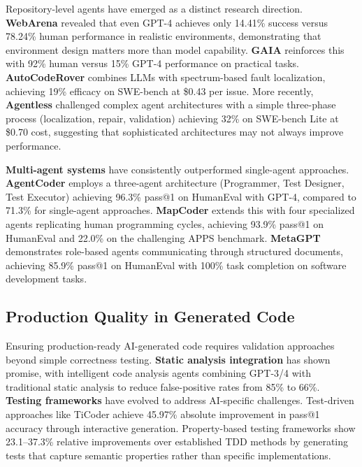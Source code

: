 \documentclass[11pt]{article}
\begin{document}
Repository-level agents have emerged as a distinct research direction. \textbf{WebArena} \citep{zhou2024webarena} revealed that even GPT-4 achieves only 14.41\% success versus 78.24\% human performance in realistic environments, demonstrating that environment design matters more than model capability. \textbf{GAIA} \citep{mialon2023gaia} reinforces this with 92\% human versus 15\% GPT-4 performance on practical tasks. \textbf{AutoCodeRover} \citep{zhang2024autocoder} combines LLMs with spectrum-based fault localization, achieving 19\% efficacy on SWE-bench at \$0.43 per issue. More recently, \textbf{Agentless} \citep{xia2024agentless} challenged complex agent architectures with a simple three-phase process (localization, repair, validation) achieving 32\% on SWE-bench Lite at \$0.70 cost, suggesting that sophisticated architectures may not always improve performance.

\textbf{Multi-agent systems} have consistently outperformed single-agent approaches. \textbf{AgentCoder} \citep{huang2023agentcoder} employs a three-agent architecture (Programmer, Test Designer, Test Executor) achieving 96.3\% pass@1 on HumanEval with GPT-4, compared to 71.3\% for single-agent approaches. \textbf{MapCoder} \citep{islam2024mapcoder} extends this with four specialized agents replicating human programming cycles, achieving 93.9\% pass@1 on HumanEval and 22.0\% on the challenging APPS benchmark. \textbf{MetaGPT} \citep{hong2023metagpt} demonstrates role-based agents communicating through structured documents, achieving 85.9\% pass@1 on HumanEval with 100\% task completion on software development tasks.

\subsection{Production Quality in Generated Code}

Ensuring production-ready AI-generated code requires validation approaches beyond simple correctness testing. \textbf{Static analysis integration} has shown promise, with intelligent code analysis agents combining GPT-3/4 with traditional static analysis to reduce false-positive rates from 85\% to 66\%. \textbf{Testing frameworks} have evolved to address AI-specific challenges. Test-driven approaches like TiCoder achieve 45.97\% absolute improvement in pass@1 accuracy through interactive generation. Property-based testing frameworks show 23.1--37.3\% relative improvements over established TDD methods by generating tests that capture semantic properties rather than specific implementations.
\end{document}
